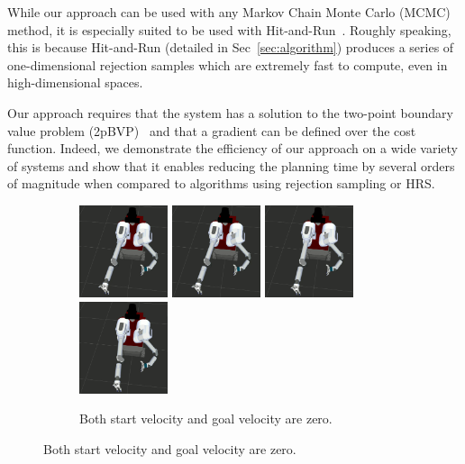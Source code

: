 \documentclass[letterpaper, 10 pt, conference]{ieeeconf}  %
\begin{document}
While our approach can be used with any Markov Chain Monte Carlo (MCMC) method, it is especially suited to be used with Hit-and-Run~\cite{KSZ11}.
Roughly speaking, this is because Hit-and-Run (detailed in Sec~\ref{sec:algorithm})
produces a series of one-dimensional rejection samples which are extremely fast to compute, even in high-dimensional spaces. 

Our approach requires that the system has a solution to the two-point boundary value problem (2pBVP)~\cite{L06} and that a gradient can be defined over the cost function.
Indeed, we demonstrate the efficiency of our approach on a wide variety of systems and show that it enables reducing the planning time by several orders of magnitude when compared to algorithms using rejection sampling or HRS.

\begin{figure}[t!]
	\centering
	\begin{minipage}[t]{0.64\linewidth}
	\begin{subfigure}[b]{\textwidth}
		\centering
		\includegraphics[height=2.7cm]{fig/motivation/slow1}
		\includegraphics[height=2.7cm]{fig/motivation/slow2}
		\includegraphics[height=2.7cm]{fig/motivation/slow3}
		\includegraphics[height=2.7cm]{fig/motivation/slow4}
		\caption{Both start velocity and goal velocity are zero.}	\vspace{4pt}

\end{subfigure}
\end{minipage}
\end{figure}
\end{document}

